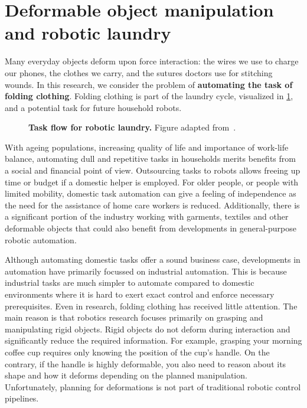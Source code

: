 \documentclass[\home/main.tex]{subfiles}
\begin{document}
\section{Deformable object manipulation and robotic laundry}
Many everyday objects deform upon force interaction: the wires we use to charge our phones, the clothes we carry, and the sutures doctors use for stitching wounds.
In this research, we consider the problem of \textbf{automating the task of folding clothing}. Folding clothing is part of the laundry cycle, visualized in \cref{fig:intro_laundry_cycle}, and a potential task for future household robots.
\begin{figure}[htbp]
    \centering
    
    \caption[Task flow for robotic laundry.]{\textbf{Task flow for robotic laundry.} Figure adapted from~\autocite{Hamajima1996}.}
    \label{fig:intro_laundry_cycle}
\end{figure}
With ageing populations, increasing quality of life and importance of work-life balance, automating dull and repetitive tasks in households merits benefits from a social and financial point of view. Outsourcing tasks to robots allows freeing up time or budget if a domestic helper is employed. For older people, or people with limited mobility, domestic task automation can give a feeling of independence as the need for the assistance of home care workers is reduced.
Additionally, there is a significant portion of the industry working with garments, textiles and other deformable objects that could also benefit from developments in general-purpose robotic automation.

Although automating domestic tasks offer a sound business case, developments in automation have primarily focussed on industrial automation. This is because industrial tasks are much simpler to automate compared to domestic environments where it is hard to exert exact control and enforce necessary prerequisites. Even in research, folding clothing has received little attention. The main reason is that robotics research focuses primarily on grasping and manipulating rigid objects. Rigid objects do not deform during interaction and significantly reduce the required information. For example, grasping your morning coffee cup requires only knowing the position of the cup's handle.
On the contrary, if the handle is highly deformable, you also need to reason about its shape and how it deforms depending on the planned manipulation. Unfortunately, planning for deformations is not part of traditional robotic control pipelines.
\end{document}
